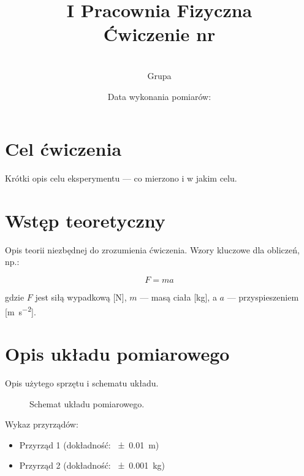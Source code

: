 \documentclass[12pt, a4paper]{article}
\title{
    \large I Pracownia Fizyczna \\[0.5em]
    \textbf{Ćwiczenie nr \nrCwiczenia} \\[0.3em]
    \LARGE \tytul
}
\author{
    \autor \\
     Grupa \nrGrupy
}
\date{
    Data wykonania pomiarów: \dataWykonania \\
}
\begin{document}

\maketitle
\thispagestyle{empty}
\newpage

\section{Cel ćwiczenia}

Krótki opis celu eksperymentu — co mierzono i w jakim celu.

\section{Wstęp teoretyczny}

Opis teorii niezbędnej do zrozumienia ćwiczenia. Wzory kluczowe dla obliczeń, np.:

\begin{equation}
    F = ma
    \label{eq:newton}
\end{equation}

gdzie $F$ jest siłą wypadkową [\si{\newton}], $m$ — masą ciała [\si{\kilogram}], a $a$ — przyspieszeniem [\si{\meter\per\second\squared}].

\section{Opis układu pomiarowego}

Opis użytego sprzętu i schematu układu.

\begin{figure}[H]
    \centering
    \caption{Schemat układu pomiarowego.}
    \label{fig:schemat}
\end{figure}

Wykaz przyrządów:
\begin{itemize}
    \item Przyrząd 1 (dokładność: \SI{\pm 0.01}{\meter})
    \item Przyrząd 2 (dokładność: \SI{\pm 0.001}{\kilogram})
\end{itemize}
\end{document}
